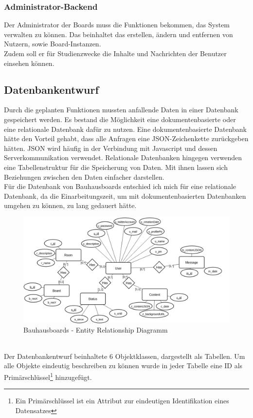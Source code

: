 \subsubsection{Administrator-Backend}\label{Administrator-Backend}
Der Administrator der Boards muss die Funktionen bekommen, das System verwalten zu können. Das beinhaltet das erstellen, ändern und entfernen von Nutzern, sowie Board-Instanzen.
\\
Zudem soll er für Studienzwecke die Inhalte und Nachrichten der Benutzer einsehen können.

\subsection{Datenbankentwurf}\label{Datenbankentwurf}
Durch die geplanten Funktionen mussten anfallende Daten in einer Datenbank gespeichert werden.
Es bestand die Möglichkeit eine dokumentenbasierte oder eine relationale Datenbank dafür zu nutzen.
Eine dokumentenbasierte Datenbank hätte den Vorteil gehabt, dass alle Anfragen eine JSON-Zeichenkette zurückgeben hätten. JSON wird häufig in der Verbindung mit Javascript und dessen Serverkommunikation verwendet.
Relationale Datenbanken hingegen verwenden eine Tabellenstruktur für die Speicherung von Daten. Mit ihnen lassen sich Beziehungen zwischen den Daten einfacher darstellen.
\\
Für die Datenbank von Bauhausboards entschied ich mich für eine relationale Datenbank, da die Einarbeitungszeit, um mit dokumentenbasierten Datenbanken umgehen zu können, zu lang gedauert hätte.
\begin{figure}[h!]
  \centering
    \includegraphics[width=1\textwidth]{./img/ER01.png}
  \caption{Bauhausboards - Entity Relationship Diagramm}
  \label{img:ER01}
\end{figure}
\\
Der Datenbankentwurf beinhaltete 6 Objektklassen, dargestellt als Tabellen. Um alle Objekte eindeutig beschreiben zu können wurde in jeder Tabelle eine ID als Primärschlüssel\footnote{Ein Primärschlüssel ist ein Attribut zur eindeutigen Identifikation eines Datensatzes} hinzugefügt.
